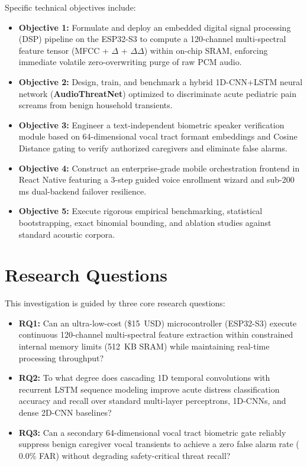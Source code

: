 \documentclass[12pt, a4paper]{report}
\begin{document}
Specific technical objectives include:
\begin{itemize}
    \item \textbf{Objective 1:} Formulate and deploy an embedded digital signal processing (DSP) pipeline on the ESP32-S3 to compute a 120-channel multi-spectral feature tensor (MFCC + $\Delta$ + $\Delta\Delta$) within on-chip SRAM, enforcing immediate volatile zero-overwriting purge of raw PCM audio.
    \item \textbf{Objective 2:} Design, train, and benchmark a hybrid 1D-CNN+LSTM neural network (\textbf{AudioThreatNet}) optimized to discriminate acute pediatric pain screams from benign household transients.
    \item \textbf{Objective 3:} Engineer a text-independent biometric speaker verification module based on 64-dimensional vocal tract formant embeddings and Cosine Distance gating to verify authorized caregivers and eliminate false alarms.
    \item \textbf{Objective 4:} Construct an enterprise-grade mobile orchestration frontend in React Native featuring a 3-step guided voice enrollment wizard and sub-200\,ms dual-backend failover resilience.
    \item \textbf{Objective 5:} Execute rigorous empirical benchmarking, statistical bootstrapping, exact binomial bounding, and ablation studies against standard acoustic corpora.
\end{itemize}

\section{Research Questions}
This investigation is guided by three core research questions:
\begin{itemize}
    \item \textbf{RQ1:} Can an ultra-low-cost (\$15~USD) microcontroller (ESP32-S3) execute continuous 120-channel multi-spectral feature extraction within constrained internal memory limits (512~KB SRAM) while maintaining real-time processing throughput?
    \item \textbf{RQ2:} To what degree does cascading 1D temporal convolutions with recurrent LSTM sequence modeling improve acute distress classification accuracy and recall over standard multi-layer perceptrons, 1D-CNNs, and dense 2D-CNN baselines?
    \item \textbf{RQ3:} Can a secondary 64-dimensional vocal tract biometric gate reliably suppress benign caregiver vocal transients to achieve a zero false alarm rate ($0.0\%$ FAR) without degrading safety-critical threat recall?
\end{itemize}
\end{document}
